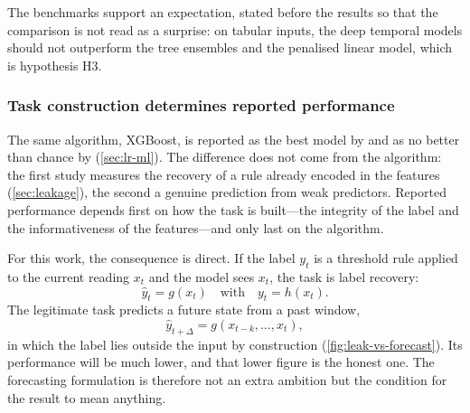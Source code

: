 The benchmarks support an expectation, stated before the results so that the comparison is not read as a surprise: on tabular inputs, the deep temporal models should not outperform the tree ensembles and the penalised linear model, which is hypothesis H3.

\subsubsection{Task construction determines reported performance}\label{sec:reported}\label{sec:task-not-algo}\label{sec:principle}

The same algorithm, XGBoost, is reported as the best model by \textcite{efendi2025} and as no better than chance by \textcite{mendoza2025} (\cref{sec:lr-ml}). The difference does not come from the algorithm: the first study measures the recovery of a rule already encoded in the features (\cref{sec:leakage}), the second a genuine prediction from weak predictors. Reported performance depends first on how the task is built---the integrity of the label and the informativeness of the features---and only last on the algorithm.

For this work, the consequence is direct. If the label $y_t$ is a threshold rule applied to the current reading $x_t$ and the model sees $x_t$, the task is label recovery:
\begin{equation}
  \hat{y}_t = g(x_t) \quad\text{with}\quad y_t = h(x_t).
\end{equation}
The legitimate task predicts a future state from a past window,
\begin{equation}
  \hat{y}_{t+\Delta} = g(x_{t-k}, \dots, x_t),
\end{equation}
in which the label lies outside the input by construction (\cref{fig:leak-vs-forecast}). Its performance will be much lower, and that lower figure is the honest one. The forecasting formulation is therefore not an extra ambition but the condition for the result to mean anything.

